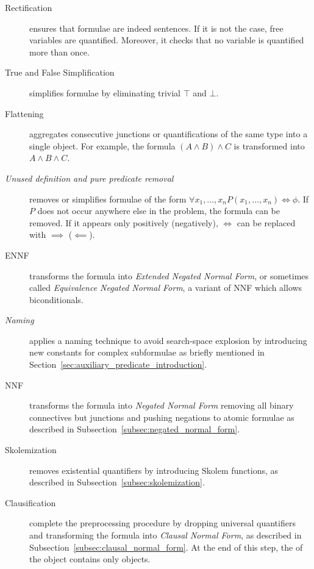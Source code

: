 \begin{description}
  \item[Rectification]  ensures that formulae are indeed sentences.
                        If it is not the case, free variables are quantified.
                        Moreover, it checks that no variable is quantified more than once.
  \item[True and False Simplification] simplifies formulae by eliminating trivial \(\top\) and \(\bot\).
  \item[Flattening] aggregates consecutive junctions or quantifications of the same type into a single object.
                    For example, the formula \((A \land B) \land C\) is transformed into \(A \land B \land C \).
  \item[\emph{Unused definition and pure predicate removal}]  removes or simplifies formulae of the form \(\forall x_1,\ldots,x_n P(x_1, \ldots,x_n) \iff \phi\).
                                                              If \(P\) does not occur anywhere else in the problem, the formula can be removed.
                                                              If it appears only positively (negatively), \(\iff\) can be replaced with \(\implies\) (\(\impliedby\)).
  \item[ENNF] transforms the formula into \emph{Extended Negated Normal Form}, or sometimes called \emph{Equivalence Negated Normal Form}, a variant of NNF which allows biconditionals.
  \item[\emph{Naming}] applies a naming technique to avoid search-space explosion by introducing new constants for complex subformulae as briefly mentioned in Section~\ref{sec:auxiliary_predicate_introduction}.
  \item[NNF] transforms the formula into \emph{Negated Normal Form} removing all binary connectives but junctions and pushing negations to atomic formulae as described in Subsection~\ref{subsec:negated_normal_form}.
  \item[Skolemization] removes existential quantifiers by introducing Skolem functions, as described in Subsection~\ref{subsec:skolemization}.
  \item[Clausification] complete the preprocessing procedure by dropping universal quantifiers and transforming the formula into \emph{Clausal Normal Form}, as described in Subsection~\ref{subsec:clausal_normal_form}.
                        At the end of this step, the  of the  object contains only  objects.
\end{description}

